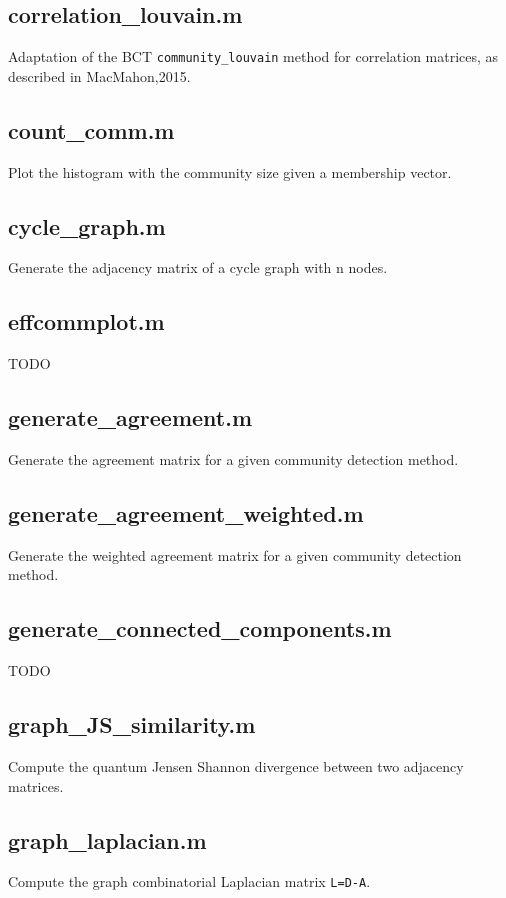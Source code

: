 \begin{itemize}[<+->]
  \subsection*{correlation\_louvain.m} Adaptation of the BCT
  \texttt{community\_louvain} method for correlation matrices, as
  described in MacMahon,2015.

  \subsection*{count\_comm.m} Plot the histogram with the community size
  given a membership vector.

  \subsection*{cycle\_graph.m} Generate the adjacency matrix of a cycle graph
  with n nodes.

  \subsection*{effcommplot.m} TODO

  \subsection*{generate\_agreement.m} Generate the agreement matrix for a
  given community detection method.

  \subsection*{generate\_agreement\_weighted.m} Generate the weighted
  agreement matrix for a given community detection method.

  \subsection*{generate\_connected\_components.m} TODO

  \subsection*{graph\_JS\_similarity.m} Compute the quantum Jensen Shannon
  divergence between two adjacency matrices.

  \subsection*{graph\_laplacian.m} Compute the graph combinatorial Laplacian
  matrix \texttt{L=D-A}.


\end{itemize}

